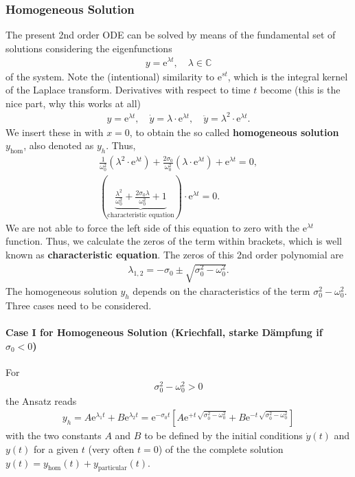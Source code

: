 \subsubsection{Homogeneous Solution}
\label{Sec:FundamentalSet}
The present 2nd order ODE can be solved by means of the
fundamental set of solutions
considering the eigenfunctions
\begin{align}
y = \mathrm{e}^{\lambda t}, \quad \lambda\in\mathbb{C}
\end{align}
of the system. Note the (intentional) similarity to $\mathrm{e}^{s t}$,
which is the integral kernel of the Laplace transform.
%
Derivatives with respect to time $t$ become (this is the nice part, why this
works at all)
\begin{align}
y = \mathrm{e}^{\lambda t},\quad
\dot{y} = \lambda \cdot \mathrm{e}^{\lambda t},\quad
\ddot{y} = \lambda^2 \cdot \mathrm{e}^{\lambda t}.
\end{align}
%
We insert these in  with $x=0$, to obtain the
so called \textbf{homogeneous solution} $y_\text{hom}$, also denoted as
$y_h$.
Thus,
\begin{align}
\frac{1}{\omega_0^2} (\lambda^2 \cdot \mathrm{e}^{\lambda t}) +
\frac{2 \sigma_0}{\omega_0^2} (\lambda \cdot \mathrm{e}^{\lambda t}) +
\mathrm{e}^{\lambda t} = 0,\nonumber\\
\label{eq:CharEq}
(\underbrace{\frac{\lambda^2}{\omega_0^2} +
\frac{2 \sigma_0 \lambda}{\omega_0^2} + 1}_\text{characteristic equation})
\cdot \mathrm{e}^{\lambda t} = 0.
\end{align}
%
We are not able to force the left side of this equation to zero with the $\mathrm{e}^{\lambda t}$
function.
Thus, we calculate the zeros of the term within brackets, which is well known as
\textbf{characteristic equation}.
%
The zeros of this 2nd order polynomial are
\begin{align}
\label{lambda12}
\lambda_{1,2} = -\sigma_0 \pm \sqrt{\sigma_0^2 - \omega_0^2}.
\end{align}
%
The homogeneous solution $y_h$ depends on the characteristics
of the term $\sigma_0^2 - \omega_0^2$.
Three cases need to be considered.

\paragraph{Case I for Homogeneous Solution (Kriechfall, starke Dämpfung if $\sigma_0<0$)}
For
\begin{align}
\sigma_0^2 - \omega_0^2 > 0
\end{align}
the Ansatz reads
\begin{align}
y_h=
A \mathrm{e}^{\lambda_1 t} + B \mathrm{e}^{\lambda_2 t}
=
\mathrm{e}^{-\sigma_0 t} [A \mathrm{e}^{+t\,\sqrt{\sigma_0^2 - \omega_0^2}}
+ B \mathrm{e}^{-t\,\sqrt{\sigma_0^2 - \omega_0^2}}]
\end{align}
with the two constants $A$ and $B$ to be defined by the initial conditions
$\dot{y}(t)$ and $y(t)$ for a given $t$ (very often $t=0$)
of the the complete solution
$y(t) = y_\text{hom}(t)+y_\text{particular}(t)$.

